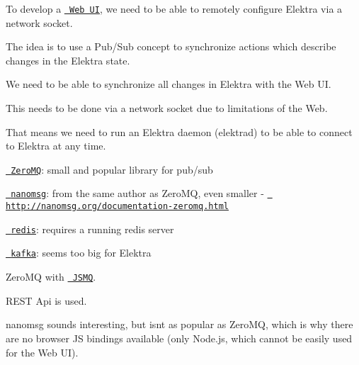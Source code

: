 To develop a \href{https://github.com/ElektraInitiative/libelektra/issues/252}{\texttt{ Web UI}}, we need to be able to remotely configure Elektra via a network socket.

The idea is to use a Pub/\+Sub concept to synchronize actions which describe changes in the Elektra state.


\begin{DoxyItemize}
\item We need to be able to synchronize all changes in Elektra with the Web UI.
\item This needs to be done via a network socket due to limitations of the Web.
\item That means we need to run an Elektra daemon ({\ttfamily elektrad}) to be able to connect to Elektra at any time.
\end{DoxyItemize}


\begin{DoxyItemize}
\item \href{http://zeromq.org/}{\texttt{ Zero\+MQ}}\+: small and popular library for pub/sub
\item \href{http://nanomsg.org/}{\texttt{ nanomsg}}\+: from the same author as Zero\+MQ, even smaller -\/ \href{http://nanomsg.org/documentation-zeromq.html}{\texttt{ http\+://nanomsg.\+org/documentation-\/zeromq.\+html}}
\item \href{http://redis.io/topics/pubsub}{\texttt{ redis}}\+: requires a running redis server
\item \href{http://kafka.apache.org/}{\texttt{ kafka}}\+: seems too big for Elektra
\item Zero\+MQ with \href{https://github.com/zeromq/JSMQ}{\texttt{ J\+S\+MQ}}.
\end{DoxyItemize}

R\+E\+ST Api is used.

nanomsg sounds interesting, but isn\textquotesingle{}t as popular as Zero\+MQ, which is why there are no browser JS bindings available (only Node.\+js, which cannot be easily used for the Web UI).